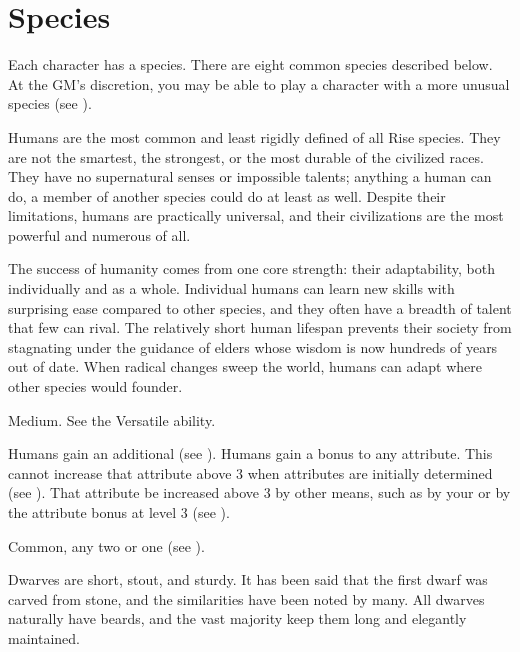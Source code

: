 \chapter{Species}\label{Species}
Each character has a species.
There are eight common species described below.
At the GM's discretion, you may be able to play a character with a more unusual species (see ).


  Humans are the most common and least rigidly defined of all Rise species.
  They are not the smartest, the strongest, or the most durable of the civilized races.
  They have no supernatural senses or impossible talents; anything a human can do, a member of another species could do at least as well.
  Despite their limitations, humans are practically universal, and their civilizations are the most powerful and numerous of all.

  The success of humanity comes from one core strength: their adaptability, both individually and as a whole.
  Individual humans can learn new skills with surprising ease compared to other species, and they often have a breadth of talent that few can rival.
  The relatively short human lifespan prevents their society from stagnating under the guidance of elders whose wisdom is now hundreds of years out of date.
  When radical changes sweep the world, humans can adapt where other species would founder.

   Medium.
   See the Versatile ability.
  \begin{raggeditemize}
     Humans gain an additional  (see ).
     Humans gain a  bonus to any attribute.
      This cannot increase that attribute above 3 when attributes are initially determined (see ).
      That attribute be increased above 3 by other means, such as by your  or by the attribute bonus at level 3 (see ).
  \end{raggeditemize}
   Common, any two  or one  (see ).


  Dwarves are short, stout, and sturdy.
  It has been said that the first dwarf was carved from stone, and the similarities have been noted by many.
  All dwarves naturally have beards, and the vast majority keep them long and elegantly maintained.

